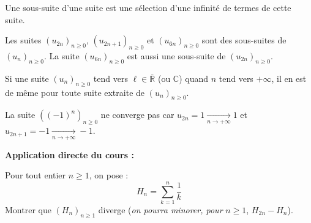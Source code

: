 \documentclass[french,11pt,twoside]{VcCours}
\newenvironment{ApplicationDirecte}{\textbf{Application directe du cours :}

}{}
\begin{document}
\begin{Remarque}{} Une sous-suite d'une suite est une \og sélection \fg d'une infinité de termes de cette suite.
\end{Remarque}

\begin{Exemple} Les suites $(u_{2n})_{n \geq 0}$, $(u_{2n+1})_{n \geq 0}$ et $(u_{6n})_{n \geq 0}$ sont des sous-suites de $(u_n)_{n \geq 0}$. La suite $(u_{6n})_{n \geq 0}$ est aussi une sous-suite de $(u_{2n})_{n \geq 0}$.
\end{Exemple}

\begin{Proposition}{} Si une suite $(u_n)_{n \geq 0}$ tend vers $\ell \in \overline{\mathbb{R}}$ (ou $\mathbb{C}$) quand $n$ tend vers $+ \infty$, il en est de même pour toute suite extraite de $(u_n)_{n \geq 0}$.
\end{Proposition}

\begin{Demonstration}{} 


%
%
%

\vspace*{7cm}
\end{Demonstration}

\begin{Exemple} La suite $((-1)^n)_{n \geq 0}$ ne converge pas car $ u_{2n}= 1 \underset{n \rightarrow + \infty}{\longrightarrow} 1$ et $ u_{2n+1} = -1 \underset{n \rightarrow + \infty}{\longrightarrow} -1$.
\end{Exemple}

\begin{ApplicationDirecte} Pour tout entier $n \geq 1$, on pose :
$$H_n = \sum_{k=1}^n \dfrac{1}{k} $$
Montrer que $(H_n)_{n \geq 1}$ diverge (\emph{on pourra minorer, pour} $n \geq 1$, $H_{2n}-H_n$).
\end{ApplicationDirecte}
\end{document}
